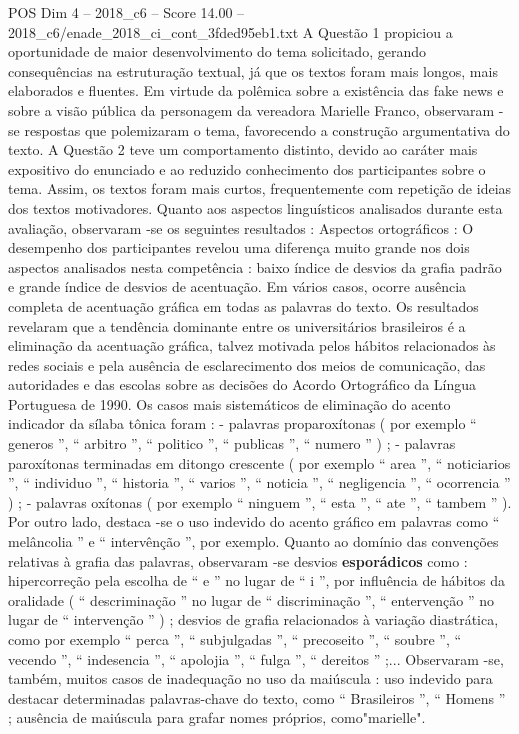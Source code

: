 \begin{textsample}{POS Dim 4 – 2018\_c6 – Score 14.00 – 2018\_c6/enade\_2018\_ci\_cont\_3fded95eb1.txt}
A Questão 1 propiciou a oportunidade de maior desenvolvimento do tema solicitado, gerando consequências na estruturação textual, já que os textos foram mais longos, mais elaborados e fluentes.
Em virtude da polêmica sobre a existência das fake news e sobre a visão pública da personagem da vereadora Marielle Franco, observaram -se respostas que polemizaram o tema, favorecendo a construção argumentativa do texto.
A Questão 2 teve um comportamento distinto, devido ao caráter mais expositivo do enunciado e ao reduzido conhecimento dos participantes sobre o tema.
Assim, os textos foram mais curtos, frequentemente com repetição de ideias dos textos motivadores.
Quanto aos aspectos linguísticos analisados durante esta avaliação, observaram -se os seguintes resultados : Aspectos ortográficos : O desempenho dos participantes revelou uma diferença muito grande nos dois aspectos analisados nesta competência : baixo índice de desvios da grafia padrão e grande índice de desvios de acentuação.
Em vários casos, ocorre ausência completa de acentuação gráfica em todas as palavras do texto.
Os resultados revelaram que a tendência dominante entre os universitários brasileiros é a eliminação da acentuação gráfica, talvez motivada pelos hábitos relacionados às redes sociais e pela ausência de esclarecimento dos meios de comunicação, das autoridades e das escolas sobre as decisões do Acordo Ortográfico da Língua Portuguesa de 1990.
Os casos mais sistemáticos de eliminação do acento indicador da sílaba tônica foram : - palavras proparoxítonas ( por exemplo “ generos ”, “ arbitro ”, “ politico ”, “ publicas ”, “ numero ” ) ; - palavras paroxítonas terminadas em ditongo crescente ( por exemplo “ area ”, “ noticiarios ”, “ individuo ”, “ historia ”, “ varios ”, “ noticia ”, “ negligencia ”, “ ocorrencia ” ) ; - palavras oxítonas ( por exemplo “ ninguem ”, “ esta ”, “ ate ”, “ tambem ” ).
Por outro lado, destaca -se o uso indevido do acento gráfico em palavras como “ melâncolia ” e “ intervênção ”, por exemplo.
Quanto ao domínio das convenções relativas à grafia das palavras, observaram -se desvios \textbf{esporádicos} como : hipercorreção pela escolha de “ e ” no lugar de “ i ”, por influência de hábitos da oralidade ( “ descriminação ” no lugar de “ discriminação ”, “ entervenção ” no lugar de “ intervenção ” ) ; desvios de grafia relacionados à variação diastrática, como por exemplo “ perca ”, “ subjulgadas ”, “ precoseito ”, “ soubre ”, “ vecendo ”, “ indesencia ”, “ apolojia ”, “ fulga ”, “ dereitos ” ;...
Observaram -se, também, muitos casos de inadequação no uso da maiúscula : uso indevido para destacar determinadas palavras-chave do texto, como “ Brasileiros ”, “ Homens ” ; ausência de maiúscula para grafar nomes próprios, como"marielle".

\end{textsample}
